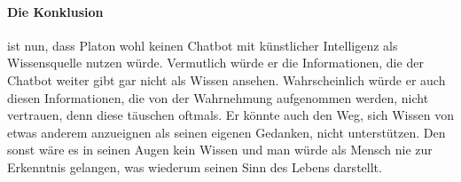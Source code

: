 \paragraph{Die Konklusion} ist nun, dass Platon wohl keinen Chatbot mit künstlicher Intelligenz als Wissensquelle nutzen würde. Vermutlich würde er die Informationen, die der Chatbot  weiter gibt gar nicht als Wissen ansehen. Wahrscheinlich würde er auch diesen Informationen, die von der Wahrnehmung aufgenommen werden, nicht vertrauen, denn diese täuschen oftmals. Er könnte auch den Weg, sich Wissen von etwas anderem anzueignen als seinen eigenen Gedanken, nicht unterstützen. Den sonst wäre es in seinen Augen kein Wissen und man würde als Mensch nie zur Erkenntnis gelangen, was wiederum seinen Sinn des Lebens darstellt.     






